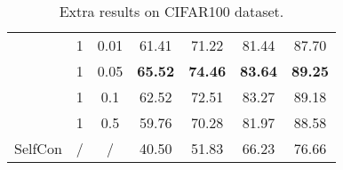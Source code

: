 \documentclass[10pt,twocolumn,letterpaper]{article}
\begin{document}
\begin{table}[htbp]
\begin{tabular}{@{}l|c|c|cccc@{}}
                        & 1   & 0.01   & 61.41          & 71.22          & 81.44          & 87.70          \\
                        & 1   & 0.05   & \textbf{65.52} & \textbf{74.46} & \textbf{83.64} & \textbf{89.25} \\
                        & 1   & 0.1    & 62.52          & 72.51          & 83.27          & 89.18          \\
                        & 1   & 0.5    & 59.76          & 70.28          & 81.97          & 88.58          \\ \midrule
SelfCon                 & /   & /      & 40.50          & 51.83          & 66.23          & 76.66          \\ \bottomrule
\end{tabular}
\caption{Extra results on CIFAR100 dataset.}
\label{tab:cifar20}
\end{table}
\end{document}

